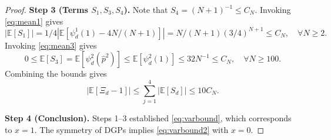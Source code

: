\documentclass[10pt,a4paper]{amsart}
\newcommand{\E}{\mathbb{E}}
\begin{document}
\begin{proof}
\medskip  

\noindent \textbf{Step 3 (Terms $S_1, S_3, S_4$).} 
 Note that $S_4 =(N+1)^{-1} \leq C_N$.   Invoking \eqref{eq:mean1} gives
  $$
   |\E [S_1] | = 1/4 |\E [ \psi^1_{d} (1) - 4N/(N+1)] | =  N/(N+1) (3/4)^{N+1} \leq   C_N, \quad \forall N \geq 2.
   $$ 
Invoking \eqref{eq:mean3} gives
 $$
  0 \leq \E [S_3]  =\E [ \psi^2_{d} (\widehat{p}^2) ] \leq \E [ \psi^2_{d} (1) ]  \leq  32   N^{-1} \leq  C_N, \quad \forall N \geq 100.
  $$ 
Combining the bounds gives
$$
|\E [ \Xi_d -1] | \leq \sum_{j=1}^4 |\E [ S_d ]| \leq 10 C_N.
$$

\noindent \textbf{Step 4 (Conclusion).} Steps 1--3 established \eqref{eq:varbound}, which corresponds to $x=1$.  The symmetry of DGPs implies \eqref{eq:varbound2} with $x=0$. 
\end{proof}
\end{document}
